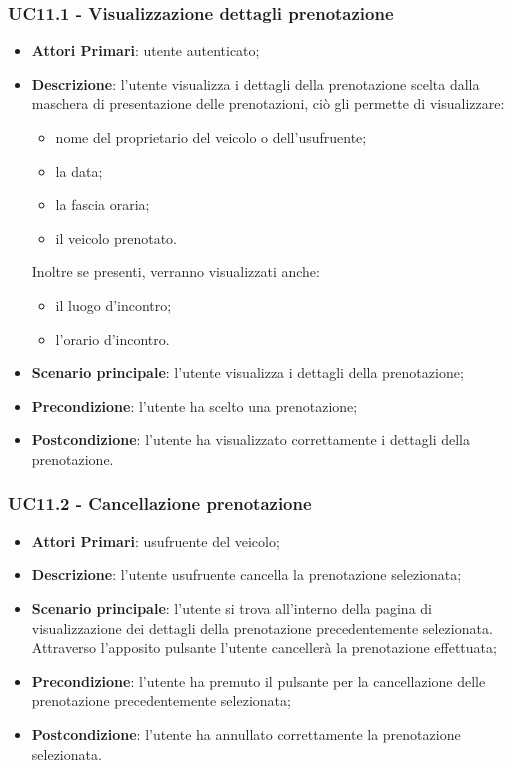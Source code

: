  \subsubsection{UC11.1 - Visualizzazione dettagli prenotazione}
\begin{itemize}
	\item \textbf{Attori Primari}: utente autenticato;
	\item \textbf{Descrizione}: l'utente visualizza i dettagli della prenotazione scelta dalla maschera di presentazione delle prenotazioni, ciò gli permette di visualizzare:
	\begin{itemize}
		\item nome del proprietario del veicolo o dell'usufruente;
		\item la data;
		\item la fascia oraria;
		\item il veicolo prenotato.
	\end{itemize}
	Inoltre se presenti, verranno visualizzati anche:
	\begin{itemize}		
		\item il luogo d'incontro;
		\item l'orario d'incontro.
	\end{itemize}
	\item \textbf{Scenario principale}: l'utente visualizza i dettagli della prenotazione;	
	\item \textbf{Precondizione}: l'utente ha scelto una prenotazione;
	\item \textbf{Postcondizione}: l'utente ha visualizzato correttamente i dettagli della prenotazione.
\end{itemize}
\subsubsection{UC11.2 - Cancellazione prenotazione}
\begin{itemize}
	\item \textbf{Attori Primari}: usufruente del veicolo;
	\item \textbf{Descrizione}: l'utente usufruente cancella la prenotazione selezionata;
	\item \textbf{Scenario principale}: l'utente si trova all'interno della pagina di visualizzazione dei dettagli della prenotazione precedentemente selezionata. Attraverso l'apposito pulsante l'utente cancellerà la prenotazione effettuata;
	\item \textbf{Precondizione}: l'utente ha premuto il pulsante per la cancellazione delle prenotazione precedentemente selezionata;
	\item \textbf{Postcondizione}: l'utente ha annullato correttamente la prenotazione selezionata.
\end{itemize}
